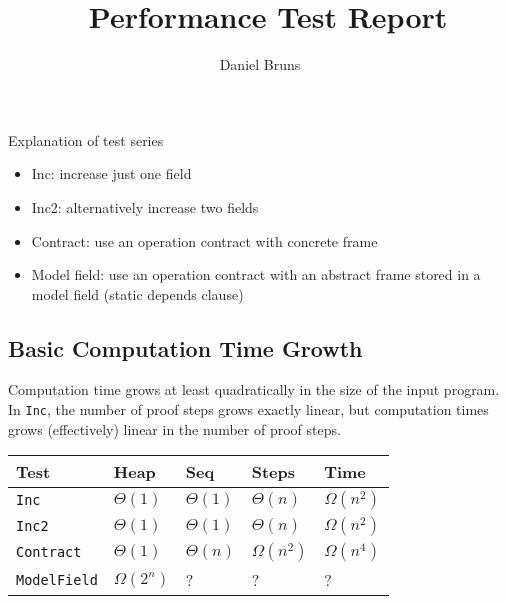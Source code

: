 \documentclass[a4paper]{article}
\title{\KeY\ Performance Test Report}
\author{Daniel Bruns}
\begin{document}
Explanation of test series
\begin{itemize}
  \item Inc: increase just one field 
  \item Inc2: alternatively increase two fields
  \item Contract: use an operation contract with
		concrete frame
  \item Model field: use an operation contract
		with an abstract frame stored in
		a model field (static depends clause)
\end{itemize}

\subsection{Basic Computation Time Growth}
Computation time grows at least quadratically in the
size of the input program.
In \texttt{Inc}, the number of proof steps grows
exactly linear, but computation times grows (effectively) linear in the number of proof steps.

\begin{tabular}{|l|l|l|l|l|} \hline
Test & Heap & Seq & Steps & Time \\ \hline
\texttt{Inc}& $\Theta(1)$ & $\Theta(1)$ & $\Theta(n)$ & $\Omega(n^2)$ \\
\texttt{Inc2} & $\Theta(1)$ & $\Theta(1)$ & $\Theta(n)$ & $\Omega(n^2)$ \\
\texttt{Contract} & $\Theta(1)$ & $\Theta(n)$ 
	& $\Omega(n^2)$ & $\Omega(n^4)$ \\
\texttt{ModelField} & $\Omega(2^n)$ & ? & ? & ? \\
\end{tabular}
\end{document}
